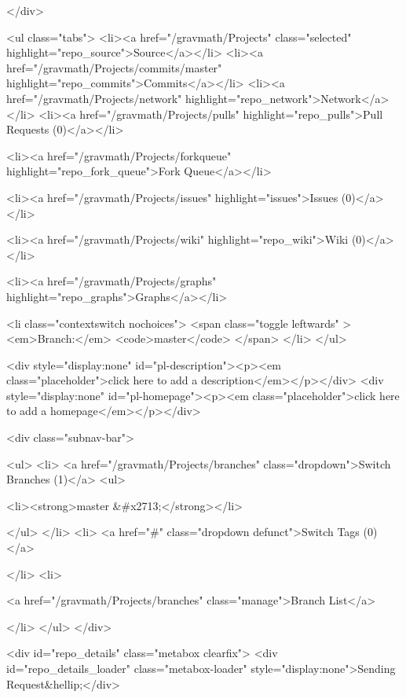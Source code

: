       </div>

        
  <ul class="tabs">
    <li><a href="/gravmath/Projects" class="selected" highlight="repo_source">Source</a></li>
    <li><a href="/gravmath/Projects/commits/master" highlight="repo_commits">Commits</a></li>
    <li><a href="/gravmath/Projects/network" highlight="repo_network">Network</a></li>
    <li><a href="/gravmath/Projects/pulls" highlight="repo_pulls">Pull Requests (0)</a></li>

    
      <li><a href="/gravmath/Projects/forkqueue" highlight="repo_fork_queue">Fork Queue</a></li>
    

    
      
      <li><a href="/gravmath/Projects/issues" highlight="issues">Issues (0)</a></li>
    

                <li><a href="/gravmath/Projects/wiki" highlight="repo_wiki">Wiki (0)</a></li>
        
    <li><a href="/gravmath/Projects/graphs" highlight="repo_graphs">Graphs</a></li>

    

    <li class="contextswitch nochoices">
      <span class="toggle leftwards" >
        <em>Branch:</em>
        <code>master</code>
      </span>
    </li>
  </ul>

  <div style="display:none" id="pl-description"><p><em class="placeholder">click here to add a description</em></p></div>
  <div style="display:none" id="pl-homepage"><p><em class="placeholder">click here to add a homepage</em></p></div>

  <div class="subnav-bar">
  
  <ul>
    <li>
      <a href="/gravmath/Projects/branches" class="dropdown">Switch Branches (1)</a>
      <ul>
        
          
            <li><strong>master &#x2713;</strong></li>
            
      </ul>
    </li>
    <li>
      <a href="#" class="dropdown defunct">Switch Tags (0)</a>
      
    </li>
    <li>
    
    <a href="/gravmath/Projects/branches" class="manage">Branch List</a>
    
    </li>
  </ul>
</div>

  
  
  
  
  
  



        
    <div id="repo_details" class="metabox clearfix">
      <div id="repo_details_loader" class="metabox-loader" style="display:none">Sending Request&hellip;</div>

